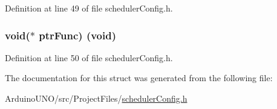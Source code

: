 Definition at line 49 of file scheduler\+Config.\+h.

\hypertarget{struct_task_type__st_type_a86cfdbe6606dca2bdfa7ff9b37e9f9be}{}
\subsubsection[{ptr\+Func}]{\setlength{\rightskip}{0pt plus 5cm}void($\ast$ ptr\+Func) (void)}\label{struct_task_type__st_type_a86cfdbe6606dca2bdfa7ff9b37e9f9be}


Definition at line 50 of file scheduler\+Config.\+h.



The documentation for this struct was generated from the following file\+:\begin{DoxyCompactItemize}
\item 
Arduino\+U\+N\+O/src/\+Project\+Files/\hyperlink{scheduler_config_8h}{scheduler\+Config.\+h}\end{DoxyCompactItemize}
